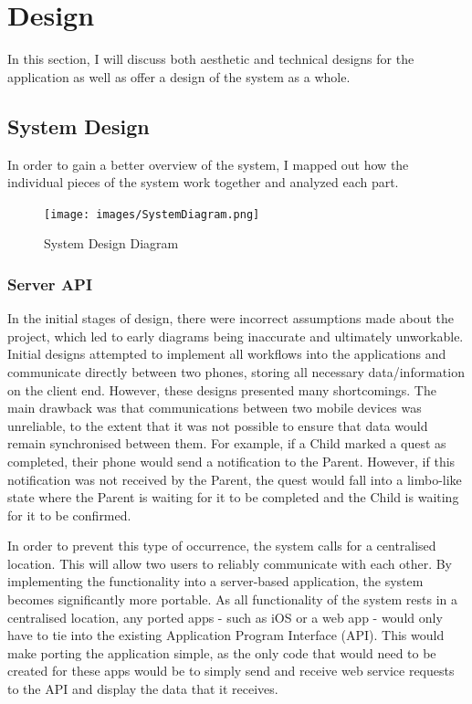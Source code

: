 \chapter{Design}
In this section, I will discuss both aesthetic and technical designs for the application as well as offer a design of the system as a whole.

\section{System Design}
In order to gain a better overview of the system, I mapped out how the individual pieces of the system work together and analyzed each part.

\begin{figure}[ht]
	\centering
	\texttt{[image: images/SystemDiagram.png]}
	\caption{System Design Diagram}
	\label{fig:systemdesign}
\end{figure} 

\subsection{Server API}
In the initial stages of design, there were incorrect assumptions made about the project, which led to early diagrams being inaccurate and ultimately unworkable.
Initial designs attempted to implement all workflows into the applications and communicate directly between two phones, storing all necessary data/information on the client end. 
However, these designs presented many shortcomings. The main drawback was that communications between two mobile devices was unreliable, to the extent that it was not possible to ensure that data would remain synchronised between them.
For example, if a Child marked a quest as completed, their phone would send a notification to the Parent.
However, if this notification was not received by the Parent, the quest would fall into a limbo-like state where the Parent is waiting for it to be completed and the Child is waiting for it to be confirmed.

In order to prevent this type of occurrence, the system calls for a centralised location. This will allow two users to reliably communicate with each other.
By implementing the functionality into a server-based application, the system becomes significantly more portable. 
As all functionality of the system rests in a centralised location, any ported apps - such as iOS or a web app - would only have to tie into the existing Application Program Interface (API).
This would make porting the application simple, as the only code that would need to be created for these apps would be to simply send and receive web service requests to the API and display the data that it receives.

